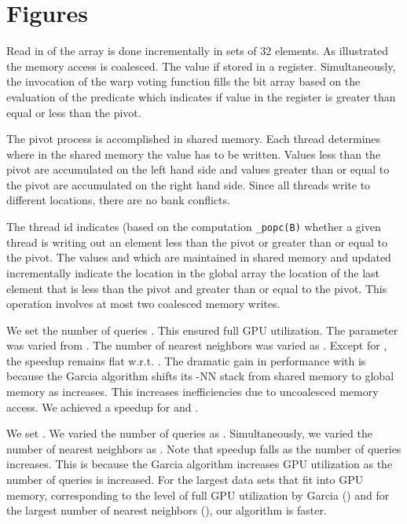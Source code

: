 \documentclass[10pt]{article}
\begin{document}
\section*{Figures}
  Read in of the array is done incrementally in sets of 32 elements. As illustrated the memory access is coalesced. The value if stored in a register. Simultaneously, the invocation of the warp voting function fills the bit array  based on the evaluation of the predicate which indicates if value in the register is greater than equal or less than the pivot.

 The pivot process is accomplished in shared memory. Each thread determines where in the shared memory the value has to be written. Values less than the pivot are accumulated on the left hand side and values greater than or equal to the pivot are accumulated on the right hand side. Since all threads write to different locations, there are no bank conflicts.

 The thread id indicates (based on the computation \texttt{\_popc(B)} whether a given thread is writing out an element less than the pivot or greater than or equal to the pivot. The values  and  which are maintained in shared memory and updated incrementally indicate the location in the global array the location of the last element that is less than the pivot and greater than or equal to the pivot. This operation involves at most two coalesced memory writes.

  We set the number of queries . This ensured full GPU utilization. The parameter  was varied from . The number of nearest neighbors  was varied as . Except for , the speedup remains flat w.r.t. . The dramatic gain in performance with  is because the Garcia algorithm shifts its -NN stack from shared memory to global memory as  increases. This increases inefficiencies due to uncoalesced memory access. We achieved a speedup  for  and .

 We set . We varied the number of queries as . Simultaneously, we varied the number of nearest neighbors as .  Note that speedup falls as the number of queries  increases. This is because the Garcia algorithm increases GPU utilization as the number of queries is increased. For the largest data sets that fit into GPU memory, corresponding to the level of full GPU utilization by Garcia () and for the largest number of nearest neighbors (), our algorithm is  faster.
\end{document}
